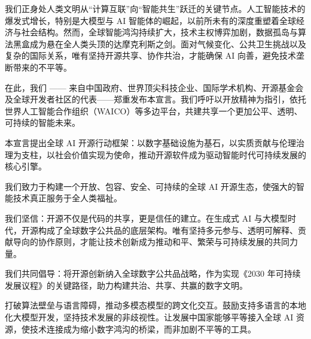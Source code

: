 \begingroup\fontsize{11}{17.8}\selectfont\setlength{\parskip}{3pt}
\label{ch1-declaration}

我们正身处人类文明从“计算互联”向“智能共生”跃迁的关键节点。人工智能技术的爆发式增长，特别是大模型与 AI 智能体的崛起，以前所未有的深度重塑着全球经济与社会结构。然而，全球智能鸿沟持续扩大，技术主权博弈加剧，数据孤岛与算法黑盒成为悬在全人类头顶的达摩克利斯之剑。面对气候变化、公共卫生挑战以及复杂的国际关系，唯有坚持开源共享、协作共治，才能确保 AI 向善，避免技术垄断带来的不平等。

在此，我们 —— 来自中国政府、世界顶尖科技企业、国际学术机构、开源基金会及全球开发者社区的代表——郑重发布本宣言。我们呼吁以开放精神为指引，依托世界人工智能合作组织（WAICO）等多边平台，共建共享一个更加公平、透明、可持续的智能未来。

本宣言提出全球 AI 开源行动框架：以数字基础设施为基石，以实质贡献与伦理治理为支柱，以社会价值实现为使命，推动开源软件成为驱动智能时代可持续发展的核心引擎。


我们致力于构建一个开放、包容、安全、可持续的全球 AI 开源生态，使强大的智能技术真正服务于全人类福祉。

我们坚信：开源不仅是代码的共享，更是信任的建立。在生成式 AI 与大模型时代，开源构成了全球数字公共品的底层架构。唯有坚持多元参与、透明可解释、贡献导向的协作原则，才能让技术创新成为推动和平、繁荣与可持续发展的共同力量。

我们共同倡导：将开源创新纳入全球数字公共品战略，作为实现《2030 年可持续发展议程》的关键路径，助力构建共治、共享、共赢的数字文明。
\clearpage{}


\par

打破算法壁垒与语言障碍，推动多模态模型的跨文化交互。鼓励支持多语言的本地化大模型开发，坚持技术发展的非歧视性。让发展中国家能够平等接入全球 AI 资源，使技术连接成为缩小数字鸿沟的桥梁，而非加剧不平等的工具。

